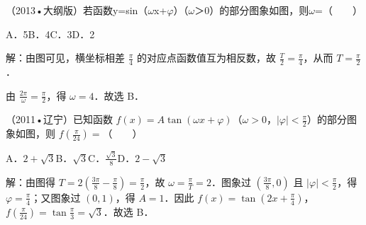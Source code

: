 \begin{question}
（2013•大纲版）若函数y=sin（\ensuremath{\omega}x+\ensuremath{\varphi}）（\ensuremath{\omega}＞0）的部分图象如图，则\ensuremath{\omega}=（　　）\par
{}\par
A．5\qquad{}B．4\qquad{}C．3\qquad{}D．2\par
\begin{solution}
解：由图可见，横坐标相差 $\frac{\pi}{4}$ 的对应点函数值互为相反数，故 $\frac T2=\frac{\pi}{4}$，从而 $T=\frac{\pi}{2}$．\par
由 $\frac{2\pi}{\omega}=\frac{\pi}{2}$，得 $\omega=4$．故选 B．\par
\end{solution}
\end{question}

\begin{question}
（2011•辽宁）已知函数 $f(x)=A\tan(\omega x+\varphi)$（$\omega>0$，$|\varphi|<\frac{\pi}{2}$）的部分图象如图，则 $f(\frac{\pi}{24})=$（　　）\par
{}\par
A．$2+\sqrt3$\qquad B．$\sqrt3$\qquad C．$\frac{\sqrt3}{8}$\qquad D．$2-\sqrt3$\par
\begin{solution}
解：由图得 $T=2(\frac{3\pi}{8}-\frac{\pi}{8})=\frac{\pi}{2}$，故 $\omega=\frac{\pi}{T}=2$．图象过 $(\frac{3\pi}{8},0)$ 且 $|\varphi|<\frac{\pi}{2}$，得 $\varphi=\frac{\pi}{4}$；又图象过 $(0,1)$，得 $A=1$．因此 $f(x)=\tan(2x+\frac{\pi}{4})$，$f(\frac{\pi}{24})=\tan\frac{\pi}{3}=\sqrt3$．故选 B．\par
\end{solution}
\end{question}

